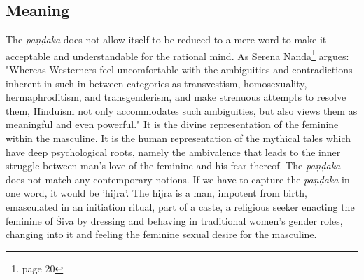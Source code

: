 \subsection{Meaning}
The {\em paṇḍaka} does not allow itself to be reduced to a mere word to make it acceptable and understandable for the rational mind. As Serena Nanda\footnote{\cite{nanda} page 20} argues: "Whereas Westerners feel uncomfortable with the ambiguities and contradictions inherent in such in-between categories as transvestism, homosexuality, hermaphroditism, and transgenderism, and make strenuous attempts to resolve them, Hinduism not only accommodates such ambiguities, but also views them as meaningful and even powerful." It is the divine representation of the feminine within the masculine. It is the human representation of the mythical tales which have deep psychological roots, namely the ambivalence that leads to the inner struggle between man's love of the feminine and his fear thereof. The {\em paṇḍaka} does not match any contemporary notions. If we have to capture the {\em paṇḍaka} in one word, it would be 'hijra'. The hijra is a man, impotent from birth, emasculated in an initiation ritual, part of a caste, a religious seeker enacting the feminine of Śiva by dressing and behaving in traditional women's gender roles, changing into it and feeling the feminine sexual desire for the masculine.
